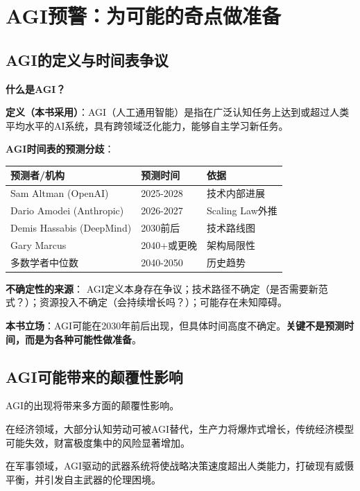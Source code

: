 \section{AGI预警：为可能的奇点做准备}

\subsection{AGI的定义与时间表争议}

\textbf{什么是AGI？}

\textbf{定义（本书采用）}：AGI（人工通用智能）是指在广泛认知任务上达到或超过人类平均水平的AI系统，具有跨领域泛化能力，能够自主学习新任务。

\textbf{AGI时间表的预测分歧}：

\begin{table}[H]
\centering
\small
\begin{tabular}{p{4cm}p{4cm}p{4cm}}
\toprule
\textbf{预测者/机构} & \textbf{预测时间} & \textbf{依据} \\
\midrule
Sam Altman (OpenAI) & 2025-2028 & 技术内部进展 \\
Dario Amodei (Anthropic) & 2026-2027 & Scaling Law外推 \\
Demis Hassabis (DeepMind) & 2030前后 & 技术路线图 \\
Gary Marcus & 2040+或更晚 & 架构局限性 \\
多数学者中位数 & 2040-2050 & 历史趋势 \\
\bottomrule
\end{tabular}
\end{table}

\textbf{不确定性的来源}：
AGI定义本身存在争议；技术路径不确定（是否需要新范式？）；资源投入不确定（会持续增长吗？）；可能存在未知障碍。

\textbf{本书立场}：AGI可能在2030年前后出现，但具体时间高度不确定。\textbf{关键不是预测时间，而是为各种可能性做准备}。

\subsection{AGI可能带来的颠覆性影响}

AGI的出现将带来多方面的颠覆性影响。

在经济领域，大部分认知劳动可被AGI替代，生产力将爆炸式增长，传统经济模型可能失效，财富极度集中的风险显著增加。

在军事领域，AGI驱动的武器系统将使战略决策速度超出人类能力，打破现有威慑平衡，并引发自主武器的伦理困境。

